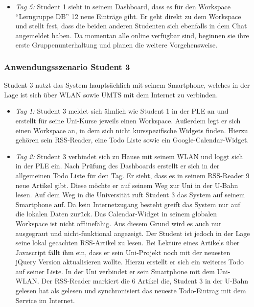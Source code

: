 \begin{itemize}
 \item \emph{Tag 5:} Student 1 sieht in seinem Dashboard, dass es für den Workspace “Lerngruppe DB” 12 neue Einträge gibt. Er geht direkt zu dem Workspace und stellt fest, dass die beiden anderen Studenten sich ebenfalls in dem Chat angemeldet haben. Da momentan alle online verfügbar sind, beginnen sie ihre erste Gruppenunterhaltung und planen die weitere Vorgehensweise.
\end{itemize}

\subsubsection*{Anwendungsszenario Student 3}
Student 3 nutzt das System hauptsächlich mit seinem Smartphone, welches in der Lage ist sich über WLAN sowie UMTS mit dem Internet zu verbinden.

\begin{itemize}
 \item \emph{Tag 1:} Student 3 meldet sich ähnlich wie Student 1 in der PLE an und erstellt für seine Uni-Kurse jeweils einen Workspace. Außerdem legt er sich einen Workspace an, in dem sich nicht kursspezifische Widgets finden. Hierzu gehören sein RSS-Reader, eine Todo Liste sowie ein Google-Calendar-Widget.
 \item \emph{Tag 2:} Student 3 verbindet sich zu Hause mit seinem WLAN und loggt sich in der PLE ein. Nach Prüfung des Dashboards erstellt er sich in der allgemeinen Todo Liste für den Tag. Er sieht, dass es in seinem RSS-Reader 9 neue Artikel gibt. Diese möchte er auf seinem Weg zur Uni in der U-Bahn lesen. Auf dem Weg in die Universität ruft Student 3 das System auf seinem Smartphone auf. Da kein Internetzugang besteht greift das System nur auf die lokalen Daten zurück. Das Calendar-Widget in seinem globalen Workspace ist nicht offlinefähig. Aus diesem Grund wird es auch nur ausgegraut und nicht-funktional angezeigt. Der Student ist jedoch in der Lage seine lokal gecachten RSS-Artikel zu lesen. Bei Lektüre eines Artikels über Javascript fällt ihm ein, dass er sein Uni-Projekt noch mit der neuesten jQuery Version aktualisieren wollte. Hierzu erstellt er sich ein weiteres Todo auf seiner Liste.
 In der Uni verbindet er sein Smartphone mit dem Uni-WLAN. Der RSS-Reader markiert die 6 Artikel die, Student 3 in der U-Bahn gelesen hat als gelesen und synchronisiert das neueste Todo-Eintrag mit dem Service im Internet.  
\end{itemize}


